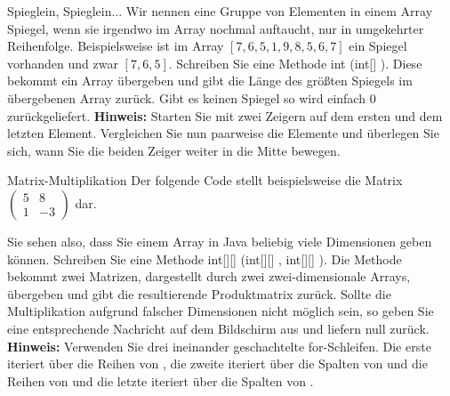 \documentclass{../preamble}
\begin{document}
\clearpage

\begin{task}[credit = \stars{2}{3}]{Spieglein, Spieglein...}
    Wir nennen eine Gruppe von Elementen in einem Array Spiegel, wenn sie irgendwo im Array nochmal auftaucht, nur  in umgekehrter Reihenfolge. Beispielsweise ist im Array \([7, 6, 5, 1, 9, 8, 5, 6, 7]\) ein Spiegel vorhanden und zwar \([7,6,5]\). Schreiben Sie eine Methode \textcolor{keywordcolor}{int} (\textcolor{keywordcolor}{int}[] ). Diese bekommt ein Array übergeben und gibt die Länge des größten Spiegels im übergebenen Array zurück. Gibt es keinen Spiegel so wird einfach \(0\) zurückgeliefert.
    \br
    \textbf{Hinweis:} Starten Sie mit zwei Zeigern auf dem ersten und dem letzten Element. Vergleichen Sie nun paarweise die Elemente und überlegen Sie sich, wann Sie die beiden Zeiger weiter in die Mitte bewegen.
    \begin{solution}
        
    \end{solution}
\end{task}

\clearpage

\begin{task}[credit = \stars{2}{3}]{Matrix-Multiplikation}
    Der folgende Code stellt beispielsweise die Matrix
    \(
    \begin{pmatrix}
        5 & 8
        \\
        1 & -3
    \end{pmatrix}
    \)
    dar.
    
    Sie sehen also, dass Sie einem Array in Java beliebig viele Dimensionen geben können.
    \br
    Schreiben Sie eine Methode \textcolor{keywordcolor}{int}[][] (\textcolor{keywordcolor}{int}[][] , \textcolor{keywordcolor}{int}[][] ).
    \br
    Die Methode bekommt zwei Matrizen, dargestellt durch zwei zwei-dimensionale Arrays, übergeben und gibt die resultierende Produktmatrix zurück. Sollte die Multiplikation aufgrund falscher Dimensionen nicht möglich sein, so geben Sie eine entsprechende Nachricht auf dem Bildschirm aus und liefern \textcolor{keywordcolor}{null} zurück.
    \br
    \textbf{Hinweis:} Verwenden Sie drei ineinander  geschachtelte \textcolor{keywordcolor}{for}-Schleifen. Die  erste iteriert über die Reihen von , die zweite iteriert über die Spalten von  und die Reihen von  und die letzte iteriert über die Spalten von .


    \clearpage

    \begin{solution}
        
    \end{solution}
\end{task}
\end{document}
